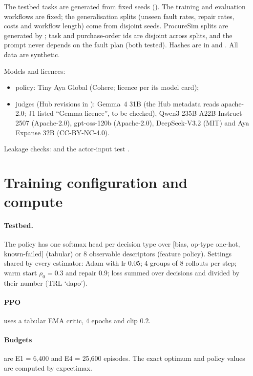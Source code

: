 The testbed tasks are generated from fixed seeds (). The training and
evaluation workflows are fixed; the generalisation splits (unseen fault rates, repair rates, costs and workflow
length) come from disjoint seeds. ProcureSim splits are generated by ;
task and purchase-order ids are disjoint across splits, and the prompt never depends on the fault plan (both tested).
Hashes are in  and . All data are synthetic.

Models and licences:
\begin{itemize}
\item policy: Tiny Aya Global (Cohere; licence per its model card);
\item judges (Hub revisions in ): Gemma~4 31B (the Hub metadata reads
apache-2.0; J1 listed ``Gemma licence'', to be checked), Qwen3-235B-A22B-Instruct-2507 (Apache-2.0), gpt-oss-120b
(Apache-2.0), DeepSeek-V3.2 (MIT) and Aya Expanse 32B (CC-BY-NC-4.0).
\end{itemize}
Leakage checks:  and the actor-input test
.

\section{Training configuration and compute}\label{app2:train}

\paragraph{Testbed.} The policy has one softmax head per decision type over [bias, op-type one-hot, known-failed]
(tabular) or 8 observable descriptors (feature policy). Settings shared by every estimator: Adam with lr 0.05; 4
groups of 8 rollouts per step; warm start $\rho_0=0.3$ and repair 0.9; loss summed over decisions and divided by
their number (TRL `dapo').

\paragraph{PPO} uses a tabular EMA critic, 4 epochs and clip 0.2.

\paragraph{Budgets} are E1 = 6{,}400 and E4 = 25{,}600 episodes. The exact optimum and policy values are computed by
expectimax.

